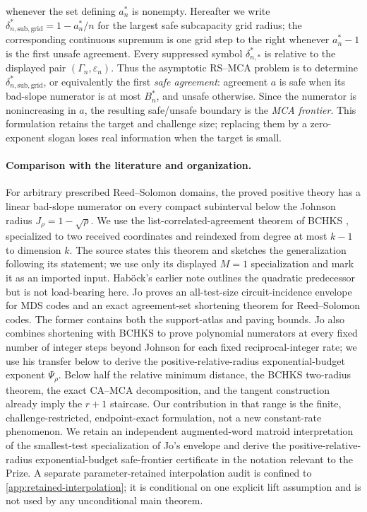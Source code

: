 \documentclass[11pt,a4paper]{amsart}
\numberwithin{equation}{section}
\theoremstyle{remark}
\newcommand{\eps}{\varepsilon}
\begin{document}
whenever the set defining \(a_n^*\) is nonempty.  Hereafter we write
\(\delta_{n,\mathrm{sub,grid}}^*=1-a_n^*/n\) for the largest safe
subcapacity grid radius; the corresponding continuous
supremum is one grid step to the right whenever \(a_n^*-1\) is the first
unsafe agreement.  Every suppressed symbol \(\delta_{n,*}^*\) is relative
to the displayed pair \((\Gamma_n,\eps_n)\).  Thus the asymptotic RS--MCA problem is to determine
\(\delta_{n,\mathrm{sub,grid}}^*\), or equivalently the first
\emph{safe agreement}: agreement \(a\) is safe when its bad-slope
numerator is at most \(B_n^*\), and unsafe otherwise.  Since the numerator
is nonincreasing in \(a\), the resulting safe/unsafe boundary is the
\emph{MCA frontier}.  This formulation retains the target and challenge
size; replacing them by a zero-exponent slogan loses real information when
the target is small.

\paragraph{Comparison with the literature and organization.}
For arbitrary prescribed Reed--Solomon domains, the proved positive theory
has a linear bad-slope numerator on every compact subinterval below the
Johnson radius \(J_\rho=1-\sqrt\rho\).  We use the list-correlated-agreement
theorem of BCHKS \cite[Thm.~4.6]{BCHKS25}, specialized to two received
coordinates and reindexed from degree at most \(k-1\) to dimension \(k\).
The source states this theorem and sketches the generalization following
its statement; we use only its displayed \(M=1\) specialization and mark it
as an imported input.
Hab\"ock's earlier note \cite{Habock25} outlines the quadratic predecessor
but is not load-bearing here.  Jo \cite{Jo26} proves an all-test-size
circuit-incidence envelope for MDS codes and an exact agreement-set
shortening theorem for Reed--Solomon codes.  The former contains both the
support-atlas and paving bounds.  Jo also combines shortening with BCHKS to
prove polynomial numerators at every fixed number of integer steps beyond
Johnson for each fixed reciprocal-integer rate; we use his transfer below
to derive the positive-relative-radius exponential-budget exponent
\(\Psi_\rho\).  Below half
the relative minimum distance, the BCHKS two-radius theorem, the exact
CA--MCA decomposition, and the tangent construction already imply the
\(r+1\) staircase.  Our contribution in that range is the finite,
challenge-restricted, endpoint-exact formulation, not a new constant-rate
phenomenon.  We retain an independent augmented-word matroid interpretation
of the smallest-test specialization of Jo's envelope and derive the
positive-relative-radius exponential-budget safe-frontier certificate in
the notation relevant to the Prize.  A separate
parameter-retained interpolation audit is confined to
\cref{app:retained-interpolation}; it is conditional on one explicit lift
assumption and is not used by any unconditional main theorem.
\end{document}
